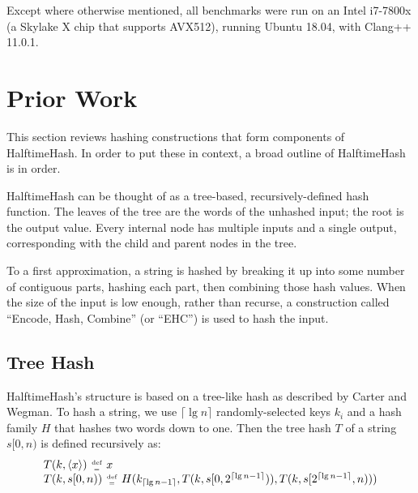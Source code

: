 \documentclass[runningheads]{llncs}
\newcommand{\nats}{\mathbb{N}}
\newcommand{\defeq}{\;\genfrac{}{}{0pt}{2}{\text{def}}{=}\;}
\begin{document}
Except where otherwise mentioned, all benchmarks were run on an Intel i7-7800x (a Skylake X chip that supports AVX512), running Ubuntu 18.04, with Clang++ 11.0.1.

\section{Prior Work}
\label{prior-work}


This section reviews hashing constructions that form components of HalftimeHash.
In order to put these in context, a broad outline of HalftimeHash is in order.

HalftimeHash can be thought of as a tree-based, recursively-defined hash function.
The leaves of the tree are the words of the unhashed input; the root is the output value.
Every internal node has multiple inputs and a single output, corresponding with the child and parent nodes in the tree.

To a first approximation, a string is hashed by breaking it up into some number of contiguous parts, hashing each part, then combining those hash values.
When the size of the input is low enough, rather than recurse, a construction called ``Encode, Hash, Combine'' (or ``EHC'') is used to hash the input.


\subsection{Tree Hash}

HalftimeHash's structure is based on a tree-like hash as described by Carter and Wegman. \cite[Section 3]{carter-wegman-79}
To hash a string, we use $\lceil \lg n \rceil$ randomly-selected keys $k_i$ and a hash family $H$ that hashes two words down to one.
Then the tree hash $T$ of a string $s[0,n)$ is defined recursively as:
\begin{equation}
\label{algebraic-badger}
\begin{array}{l}
T(k, \langle x \rangle) \defeq x \\
T(k, s[0,n)) \defeq H
(k_{  \lceil \lg n - 1 \rceil},
T(k, s[0, 2^{\lceil \lg n - 1 \rceil}) ),
T(k, s[ 2^{\lceil \lg n - 1 \rceil}, n) ))
\end{array}
\end{equation}
\end{document}

